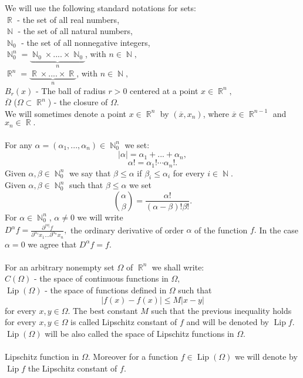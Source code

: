 \documentclass[12pt]{article}
\theoremstyle{definition}
\DeclareMathOperator\Lip{Lip}
\DeclareMathOperator\rr{\mathbb{R}}
\DeclareMathOperator\nn{\mathbb{N}}
\begin{document}
We will use the following standard notations for sets:\\
$\rr$ - the set of all real numbers,\\
$\nn$ - the set of all natural numbers,\\
$\nn_0$ - the set of all nonnegative integers,\\
$\nn_0^n=\underbrace{\nn_0 \times ....\times \nn_0}_{n}$, with $n \in \nn,$\\
$\rr^n=\underbrace{\rr \times ....\times \rr}_{n}$, with $n \in \nn,$\\
$B_r(x)$ - The ball of radius $r>0$ centered at a point $x\in \rr^n,$ \\ 
$\overline \Omega$ ($\Omega \subset \rr^n$) - the closure of $\Omega$. \\
We will sometimes denote a point $x \in \rr^n$ by $(\overline x ,x_n)$, where $\overline x \in \rr^{n-1}$ and $x_n \in \rr.$\\\\
For any $\alpha=(\alpha_1,...,\alpha_n) \in \nn_0^n$ we set:
\[ |\alpha|=\alpha_1+...+\alpha_n,\]
\[ \alpha!=\alpha_1!\cdots\alpha_n!.\]
Given $\alpha,\beta \in \nn_0^n$ we say that $\beta\le \alpha$ if $\beta_i\le\alpha_i$ for every $i \in \nn.$\\
Given $\alpha,\beta \in \nn_0^n$ such that $\beta \le \alpha$ we set 
\[ {\alpha \choose \beta} = \frac{\alpha!}{(\alpha-\beta)!\beta!}. \]
For $\alpha \in \nn_0^n$, $\alpha \neq0$ we will write\\
$D^\alpha f=\frac{\partial^{|\alpha|}f}{\partial^{\alpha_1}x_1...\partial^{\alpha_n}x_n},$ the ordinary derivative of order $\alpha$ of the function $f.$  In the case $\alpha=0$ we agree that $D^\alpha f=f.$ \\\\
For an arbitrary nonempty set $\Omega$ of $\rr^n$ we shall write:\\
$C(\Omega)$ - the space of continuous functions in $\Omega,$\\
$\Lip(\Omega)$ - the space of functions defined in $\Omega$ such that
\[ |f(x)-f(x)|\le M |x-y|\]
for every $x,y \in \Omega$. The best constant $M$ such that the previous inequality holds for every $x,y \in \Omega$ is called Lipschitz constant of $f$ and will be denoted by $\Lip f.$ $\Lip(\Omega)$ will be also called the space of Lipschitz functions in $\Omega.$ \\\\
 Lipschitz function in $\Omega.$ Moreover for a function $f \in \Lip(\Omega)$ we will denote by $\Lip f$ the Lipschitz constant of $f$.\\ \\
\end{document}
